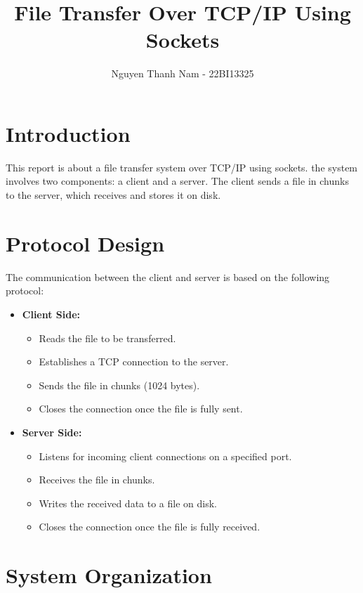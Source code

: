 \documentclass{article}
\title{File Transfer Over TCP/IP Using Sockets}
\author{Nguyen Thanh Nam - 22BI13325}
\date{}  %
\begin{document}
\maketitle

\section{Introduction}
This report is about a file transfer system over TCP/IP using sockets. the system involves two components: a client and a server. The client sends a file in chunks to the server, which receives and stores it on disk. 

\section{Protocol Design}
The communication between the client and server is based on the following protocol:

\begin{itemize}
    \item \textbf{Client Side:}
    \begin{itemize}
        \item Reads the file to be transferred.
        \item Establishes a TCP connection to the server.
        \item Sends the file in chunks (1024 bytes).
        \item Closes the connection once the file is fully sent.
    \end{itemize}
    \item \textbf{Server Side:}
    \begin{itemize}
        \item Listens for incoming client connections on a specified port.
        \item Receives the file in chunks.
        \item Writes the received data to a file on disk.
        \item Closes the connection once the file is fully received.
    \end{itemize}
\end{itemize}

\clearpage
\section{System Organization}
\end{document}
